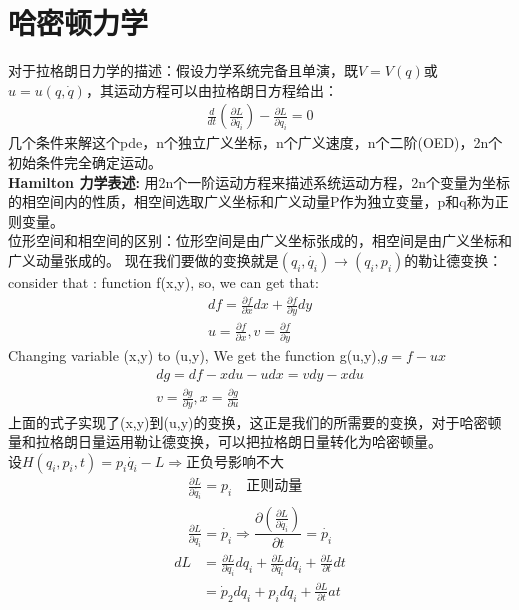 \documentclass[UTF8,10pt]{article}
\begin{document}
\section{哈密顿力学}
对于拉格朗日力学的描述：假设力学系统完备且单演，既$V=V(q)$或$u=u(q,\dot{q})$，其运动方程可以由拉格朗日方程给出：
\begin{align*}
    \frac{d}{dt}(\frac{\partial L}{\partial \dot{q_i}})-\frac{\partial L}{\partial q_i}=0
\end{align*}
几个条件来解这个pde，n个独立广义坐标，n个广义速度，n个二阶(OED)，2n个初始条件完全确定运动。\\
\textbf{Hamilton 力学表述:}
用2n个一阶运动方程来描述系统运动方程，2n个变量为坐标的相空间内的性质，相空间选取广义坐标和广义动量P作为独立变量，p和q称为正则变量。\\
位形空间和相空间的区别：位形空间是由广义坐标张成的，相空间是由广义坐标和广义动量张成的。
现在我们要做的变换就是$(q_i,\dot{q_i})\rightarrow(q_i,p_i)$的勒让德变换：\\
consider that : function f(x,y), so, we can get that:
\begin{align*}
    df=\frac{\partial f}{\partial x}dx+\frac{\partial f}{\partial y}dy \\
    u=\frac{\partial f}{\partial x},v=\frac{\partial f}{\partial y}
\end{align*}
Changing variable (x,y) to (u,y), We get the function g(u,y),$g=f-ux$
\begin{align*}
    dg=df-xdu-udx=vdy-xdu \\
    v=\frac{\partial g}{\partial y},x=\frac{\partial g}{\partial u}
\end{align*}
上面的式子实现了(x,y)到(u,y)的变换，这正是我们的所需要的变换，对于哈密顿量和拉格朗日量运用勒让德变换，可以把拉格朗日量转化为哈密顿量。\\
设$H(q_i,p_i,t)=p_i\dot{q_i}-L\Rightarrow$正负号影响不大
\begin{align*}
    \frac{\partial L}{\partial \dot{q_i}}=p_i\quad\text{正则动量} \\
    \frac{\partial L}{\partial q_i}=\dot{p_i}\Rightarrow \dfrac{\partial (\frac{\partial L}{\partial \dot{q_i}})}{\partial t}=\dot{p_i}
\end{align*}
\begin{equation*}
    \begin{aligned}
        d L & =\frac{\partial L}{\partial q_{i}} d q_{i}+\frac{\partial L}{\partial \dot{q_{i}}} d \dot{q_{i}}+\frac{\partial L}{\partial t} d t \\
            & =\dot{p}_{2} d q_{i}+p_{i} d \dot{q}_{i}+\frac{\partial L}{\partial t} a t
    \end{aligned}
\end{equation*}
\end{document}

